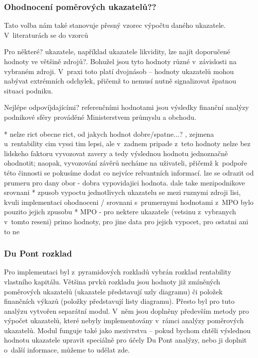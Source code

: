 \subsubsection{Ohodnocení poměrových ukazatelů??}

Tato volba nám také stanovuje přesný vzorec výpočtu daného ukazatele. V~literaturách se do vzorců 

Pro některé? ukazatele, například ukazatele likvidity, lze najít doporučené hodnoty ve většině zdrojů?. Bohužel jsou tyto hodnoty různé v~závislosti na vybraném zdroji. V~praxi toto platí dvojnásob -- hodnoty ukazatelů mohou nabývat extrémních odchylek, přičemž to nemusí nutně signalizovat špatnou situaci podniku. 

Nejlépe odpovíjdajícími? referenčními hodnotami jsou výsledky finanční analýzy podnikové sféry prováděné Ministerstvem průmyslu a obchodu. 

* nelze rict obecne rict, od jakych hodnot dobre/spatne...? , zejmena u~rentability cim vyssi tim lepsi, ale v~zadnem pripade z~teto hodnoty nelze bez lidskeho faktoru vyvozovat zavery a tedy výslednou hodnotu jednoznačně ohodnotit; naopak, vyvozování závěrů necháme na uživateli, přičemž k~podpoře této činnosti se pokusíme dodat co nejvíce relvantních informací. lze se odrazit od prumeru pro dany obor - dobra vypovidajici hodnota. dale take mezipodnikove srovnani
* zpusob vypoctu jednotlivych ukazatelu se mezi ruznymi zdroji lisi, kvuli implementaci ohodnoceni / srovnani s~prumernymi hodnotami z~MPO bylo pouzito jejich zpusobu
* MPO - pro nektere ukazatele (vetsinu z~vybranych v~tomto reseni) primo hodnoty, pro jine data pro jejich vypocet, pro ostatni ani to ne


\subsubsection{Du Pont rozklad}
Pro implementaci byl z~pyramidových rozkladů vybrán rozklad rentability vlastního kapitálu. Většina prvků rozkladu jsou hodnoty již zmíněných poměrových ukazatelů (ukazatele představují uzly diagramu) či položek finančních výkazů (položky představují listy diagramu). Přesto byl pro tuto analýzu vytvořen separátní modul. V~něm jsou doplněny především metody pro výpočet ukazatelů, které nebyly implementovány v~rámci analýzy poměrových ukazatelů. Modul funguje také jako mezivrstva -- pokud bychom chtěli výslednou hodnotu ukazatele upravit speciálně pro účely Du Pont analýzy, nebo ji doplnit o~další informace, můžeme to udělat zde. 

